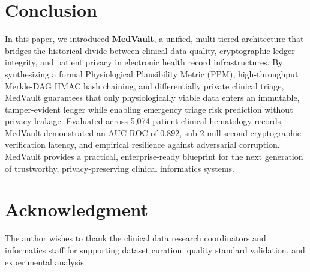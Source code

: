 \documentclass[conference]{IEEEtran}
\begin{document}
\section{Conclusion}
\label{sec:conclusion}
In this paper, we introduced \textbf{MedVault}, a unified, multi-tiered architecture that bridges the historical divide between clinical data quality, cryptographic ledger integrity, and patient privacy in electronic health record infrastructures. By synthesizing a formal Physiological Plausibility Metric (PPM), high-throughput Merkle-DAG HMAC hash chaining, and differentially private clinical triage, MedVault guarantees that only physiologically viable data enters an immutable, tamper-evident ledger while enabling emergency triage risk prediction without privacy leakage. Evaluated across 5,074 patient clinical hematology records, MedVault demonstrated an AUC-ROC of $0.892$, sub-2-millisecond cryptographic verification latency, and empirical resilience against adversarial corruption. MedVault provides a practical, enterprise-ready blueprint for the next generation of trustworthy, privacy-preserving clinical informatics systems.

\section*{Acknowledgment}
The author wishes to thank the clinical data research coordinators and informatics staff for supporting dataset curation, quality standard validation, and experimental analysis.

\balance


\end{document}
